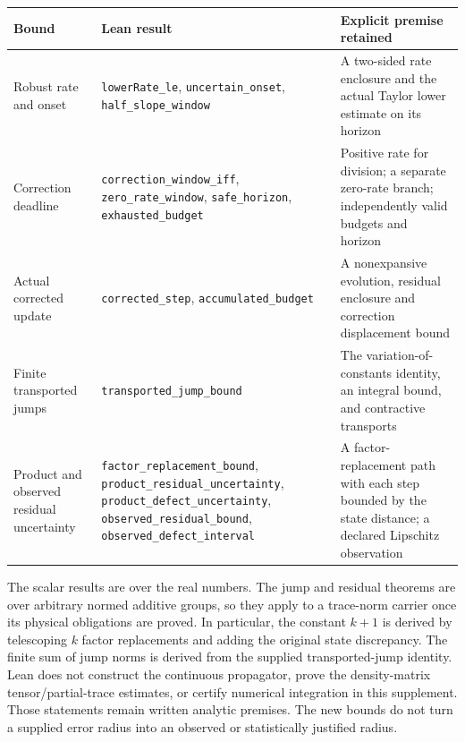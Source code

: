 \documentclass[
  11pt,
]{article}
\begin{document}
\begin{longtable}[]{@{}
  >{\raggedright\arraybackslash}p{}
  >{\raggedright\arraybackslash}p{}
  >{\raggedright\arraybackslash}p{}@{}}
\toprule\noalign{}
\begin{minipage}[b]{\linewidth}\raggedright
Bound
\end{minipage} & \begin{minipage}[b]{\linewidth}\raggedright
Lean result
\end{minipage} & \begin{minipage}[b]{\linewidth}\raggedright
Explicit premise retained
\end{minipage} \\
\midrule\noalign{}
\endhead
\bottomrule\noalign{}
\endlastfoot
Robust rate and onset & \texttt{lowerRate\_le}, \texttt{uncertain\_onset}, \texttt{half\_slope\_window} & A two-sided rate enclosure and the actual Taylor lower estimate on its horizon \\
Correction deadline & \texttt{correction\_window\_iff}, \texttt{zero\_rate\_window}, \texttt{safe\_horizon}, \texttt{exhausted\_budget} & Positive rate for division; a separate zero-rate branch; independently valid budgets and horizon \\
Actual corrected update & \texttt{corrected\_step}, \texttt{accumulated\_budget} & A nonexpansive evolution, residual enclosure and correction displacement bound \\
Finite transported jumps & \texttt{transported\_jump\_bound} & The variation-of-constants identity, an integral bound, and contractive transports \\
Product and observed residual uncertainty & \texttt{factor\_replacement\_bound}, \texttt{product\_residual\_uncertainty}, \texttt{product\_defect\_uncertainty}, \texttt{observed\_residual\_bound}, \texttt{observed\_defect\_interval} & A factor-replacement path with each step bounded by the state distance; a declared Lipschitz observation \\
\end{longtable}

The scalar results are over the real numbers. The jump and residual theorems
are over arbitrary normed additive groups, so they apply to a trace-norm
carrier once its physical obligations are proved. In particular, the constant
\(k+1\) is derived by telescoping \(k\) factor replacements and adding the original
state discrepancy. The finite sum of jump norms is derived from the supplied
transported-jump identity. Lean does not construct the continuous propagator,
prove the density-matrix tensor/partial-trace estimates, or certify numerical
integration in this supplement. Those statements remain written analytic
premises. The new bounds do not turn a supplied error radius into an observed
or statistically justified radius.
\end{document}

